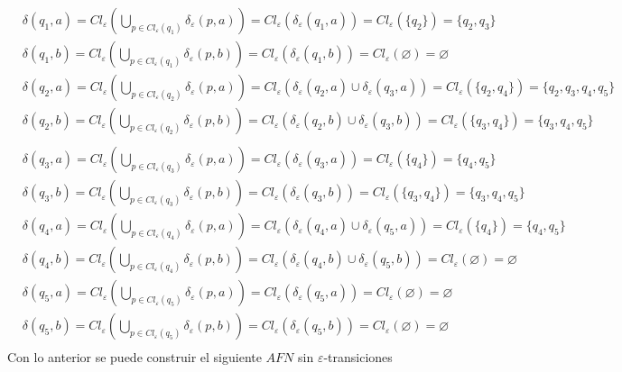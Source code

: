 {  \begin{align*}
    &\delta(q_1, a) = Cl_{\varepsilon}(\bigcup_{p \in Cl_{\varepsilon}(q_1)} \delta_{\varepsilon}(p,a)) = Cl_\varepsilon(\delta_\varepsilon(q_1,a)) = Cl_\varepsilon(\{q_2\}) = \{q_2, q_3\} \\
    &\delta(q_1, b) = Cl_{\varepsilon}(\bigcup_{p \in Cl_{\varepsilon}(q_1)} \delta_{\varepsilon}(p,b)) = Cl_\varepsilon(\delta_\varepsilon(q_1,b)) = Cl_\varepsilon(\varnothing) = \varnothing \\
    &\delta(q_2, a) = Cl_{\varepsilon}(\bigcup_{p \in Cl_{\varepsilon}(q_2)} \delta_{\varepsilon}(p,a)) = Cl_\varepsilon(\delta_\varepsilon(q_2,a)\cup \delta_\varepsilon(q_3, a)) = Cl_\varepsilon(\{q_2,q_4\}) = \{q_2, q_3, q_4, q_5\} \\
    &\delta(q_2, b) = Cl_{\varepsilon}(\bigcup_{p \in Cl_{\varepsilon}(q_2)} \delta_{\varepsilon}(p,b)) = Cl_\varepsilon(\delta_\varepsilon(q_2,b)\cup \delta_\varepsilon(q_3, b)) = Cl_\varepsilon(\{q_3,q_4\}) = \{q_3, q_4, q_5\} \\
  \end{align*}
  \begin{align*}
    &\delta(q_3, a) = Cl_{\varepsilon}(\bigcup_{p \in Cl_{\varepsilon}(q_3)} \delta_{\varepsilon}(p,a)) = Cl_\varepsilon(\delta_\varepsilon(q_3, a)) = Cl_\varepsilon(\{q_4\}) = \{q_4, q_5\} \\
    &\delta(q_3, b) = Cl_{\varepsilon}(\bigcup_{p \in Cl_{\varepsilon}(q_3)} \delta_{\varepsilon}(p,b)) = Cl_\varepsilon(\delta_\varepsilon(q_3, b)) = Cl_\varepsilon(\{q_3,q_4\}) = \{q_3,q_4, q_5\} \\
    &\delta(q_4, a) = Cl_{\varepsilon}(\bigcup_{p \in Cl_{\varepsilon}(q_4)} \delta_{\varepsilon}(p,a)) = Cl_\varepsilon(\delta_\varepsilon(q_4, a)\cup \delta_\varepsilon(q_5,a)) = Cl_\varepsilon(\{q_4\}) = \{q_4, q_5\} \\
    &\delta(q_4, b) = Cl_{\varepsilon}(\bigcup_{p \in Cl_{\varepsilon}(q_4)} \delta_{\varepsilon}(p,b)) = Cl_\varepsilon(\delta_\varepsilon(q_4, b)\cup \delta_\varepsilon(q_5,b)) = Cl_\varepsilon(\varnothing) = \varnothing\\
    &\delta(q_5, a) = Cl_{\varepsilon}(\bigcup_{p \in Cl_{\varepsilon}(q_5)} \delta_{\varepsilon}(p,a)) = Cl_\varepsilon(\delta_\varepsilon(q_5,a)) = Cl_\varepsilon(\varnothing) = \varnothing \\
    &\delta(q_5, b) = Cl_{\varepsilon}(\bigcup_{p \in Cl_{\varepsilon}(q_5)} \delta_{\varepsilon}(p,b)) = Cl_\varepsilon(\delta_\varepsilon(q_5,b)) = Cl_\varepsilon(\varnothing) = \varnothing \\
  \end{align*}
  Con lo anterior se puede construir el siguiente $AFN$ sin $\varepsilon$-transiciones
  \begin{center}
\end{center}}
